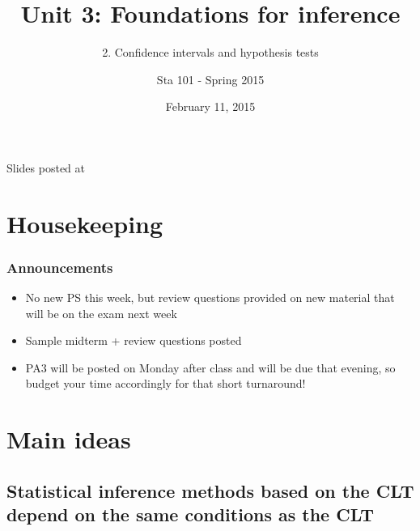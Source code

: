 \documentclass[11pt,containsverbatim,handout,xcolor=xelatex,dvipsnames,table]{beamer}
\title{Unit 3: Foundations for inference}
\subtitle{2. Confidence intervals and hypothesis tests}
\author{Sta 101 - Spring 2015}
\date{February 11, 2015}
\institute{Duke University, Department of Statistical Science}
\begin{document}


\begin{frame}[plain]

\titlepage
\vfill
{\scriptsize {} \hfill Slides posted at  \webLink{\CourseSite}{\CourseSite}}
\addtocounter{framenumber}{-1} 

\end{frame}


\section{Housekeeping}


\begin{frame}
\frametitle{Announcements}

\begin{itemize}

\item No new PS this week, but review questions provided on new material that will be on the exam next week

\item Sample midterm + review questions posted

\item PA3 will be posted on Monday after class and will be due that evening, so budget your time accordingly for that short turnaround!

\end{itemize}

\end{frame}


\section{Main ideas}


\subsection{Statistical inference methods based on the CLT depend on the same conditions as the CLT}
\label{mi1}

\end{document}
